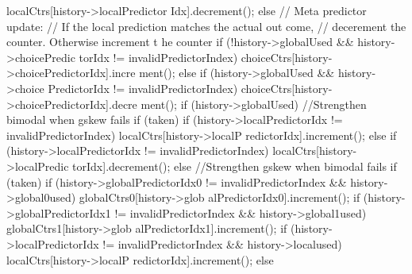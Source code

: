 \begin{DoxyCode}
{{{{{                                                localCtrs[history->localPredictor
      Idx].decrement();
                                }
                        } else {
                                // Meta predictor update:
                                // If the local prediction matches the actual out
      come,
                                // decerement the counter.  Otherwise increment t
      he counter
                                if (!history->globalUsed && history->choicePredic
      torIdx != invalidPredictorIndex) {
                                    choiceCtrs[history->choicePredictorIdx].incre
      ment();
                                } else if (history->globalUsed && history->choice
      PredictorIdx != invalidPredictorIndex) {
                                    choiceCtrs[history->choicePredictorIdx].decre
      ment();
                                }
                                if (history->globalUsed) {
                                   //Strengthen bimodal when gskew fails
                                        if (taken) {
                                                if (history->localPredictorIdx !=
       invalidPredictorIndex)
                                                        localCtrs[history->localP
      redictorIdx].increment();
                                        } else {
                                                if (history->localPredictorIdx !=
       invalidPredictorIndex)
                                                   localCtrs[history->localPredic
      torIdx].decrement();
                                        }
                                } else {
                                   //Strengthen gskew when bimodal fails
                                        if (taken) {
                                                if (history->globalPredictorIdx0 
      != invalidPredictorIndex && history->global0used)
                                                        globalCtrs0[history->glob
      alPredictorIdx0].increment();
                                                if (history->globalPredictorIdx1 
      != invalidPredictorIndex && history->global1used)
                                                        globalCtrs1[history->glob
      alPredictorIdx1].increment();
                                                if (history->localPredictorIdx !=
       invalidPredictorIndex && history->localused)
                                                        localCtrs[history->localP
      redictorIdx].increment();
                                        } else {
}}}}}}
\end{DoxyCode}
